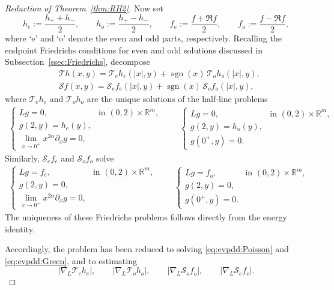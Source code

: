 \documentclass[12pt]{amsart}
\begin{document}
\begin{proof}[Reduction of Theorem~\ref{thm:RH2}]
Now set
\begin{equation*}
    h_{e}:= \frac{h_+ + h_-}{2},\qquad h_{o}:= \frac{h_+ - h_-}{2},\qquad f_e:= \frac{f + \mathfrak R f}{2},\qquad f_o:= \frac{f - \mathfrak R f}{2},
\end{equation*}
where `e' and `o' denote the even and odd parts, respectively. Recalling the endpoint Friedrichs conditions for even and odd solutions discussed in Subsection~\ref{ssec:Friedrichs}, decompose
\begin{align*}
    &\mathcal{T}h(x,y) = \mathcal{T}_e h_e(|x|, y) + \operatorname{sgn}(x)\, \mathcal{T}_o h_o(|x|,y),\\
    &\mathcal{S}f(x,y) = \mathcal{S}_e f_e(|x|,y) + \operatorname{sgn}(x)\, \mathcal{S}_o f_o(|x|,y),
\end{align*}
where $\mathcal{T}_{e}h_{e}$ and $\mathcal{T}_o h_o$ are the unique solutions of the half-line problems
\begin{align}\label{eq:evpdd:Poisson}
\begin{cases}
        Lg = 0, & \text{in } (0,2)\times \mathbb{R}^m,\\
        g(2,y)= h_e(y),\\
        \lim_{x\to 0^+} x^{2\alpha} \partial_x g = 0,
    \end{cases} \qquad
    \begin{cases}
        Lg = 0, & \text{in } (0,2)\times \mathbb{R}^m,\\
        g(2,y)= h_o(y),\\
        g(0^+,y) = 0.
    \end{cases}
\end{align}
Similarly, $\mathcal{S}_e f_e$ and $\mathcal{S}_o f_o$ solve
\begin{align}\label{eq:evpdd:Green}
\begin{cases}
        Lg = f_e, & \text{in } (0,2)\times \mathbb{R}^m,\\
        g(2,y)= 0,\\
        \lim_{x\to 0^+} x^{2\alpha} \partial_x g = 0,
    \end{cases} \qquad
    \begin{cases}
        Lg = f_o, & \text{in } (0,2)\times \mathbb{R}^m,\\
        g(2,y)= 0,\\
        g(0^+,y) = 0.
    \end{cases}
\end{align}
The uniqueness of these Friedrichs problems follows directly from the energy identity.

Accordingly, the problem has been reduced to solving \eqref{eq:evpdd:Poisson} and \eqref{eq:evpdd:Green}, and to estimating
\begin{equation*}
    |\nabla_L \mathcal{T}_e h_e|,\qquad |\nabla_L \mathcal{T}_o h_o|, \qquad |\nabla_L \mathcal{S}_o f_o|, \qquad |\nabla_L \mathcal{S}_e f_e|.
\end{equation*}
\end{proof}
\end{document}
